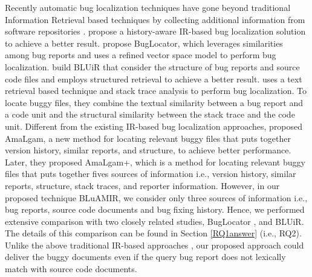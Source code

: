 \documentclass[sigconf,review,anonymous]{acmart}
\begin{document}
Recently automatic bug localization techniques have gone beyond traditional
Information Retrieval based techniques by collecting additional information from software repositories \cite{Sisman, Jian, Saha, Moreno, Wang}.
\citet{Sisman} propose a history-aware IR-based bug localization solution to achieve a better
result. \citet{Jian} propose BugLocator, which leverages similarities among bug reports and uses a refined vector space model to perform bug localization. \citet{Saha} build BLUiR that consider the structure of bug reports and source code files and employs structured retrieval to achieve a better result. \citet{Moreno} uses a text retrieval based technique and stack trace analysis to perform bug localization. To locate buggy files, they combine the textual similarity between a bug report and a code unit and the structural similarity between the stack trace and the code unit. Different from the existing IR-based bug localization approaches, \citet{Wang} proposed AmaLgam, a new method for locating relevant buggy files that puts together version history, similar reports, and structure, to achieve better performance. 
Later, they proposed AmaLgam+\cite{Wang2}, which is a method for locating relevant buggy files that puts together fives sources of information i.e., version history, similar reports, structure, stack traces, and reporter information. 
However, in our proposed technique BLuAMIR, we consider only three sources of information i.e., bug reports, source code documents and bug fixing history. 
Hence, we performed extensive comparison with two closely related studies, BugLocator \cite{Jian}, and BLUiR\cite{Saha}.
The details of this comparison can be found in Section \ref{RQ1answer} (i.e., RQ2).
Unlike the above traditional IR-based approaches \cite{Sisman, Jian, Saha, Moreno, Wang, Wang2}, our proposed approach could deliver the buggy documents even if the query bug report does not lexically match with source code documents.
\end{document}
